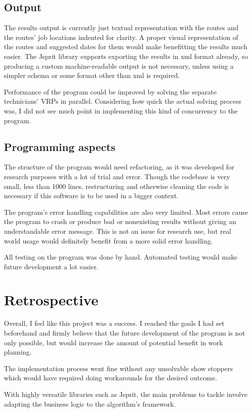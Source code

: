 \subsection{Output}
The results output is currently just textual representation with the routes and the routes' job locations indented for clarity. A proper visual representation of the routes and suggested dates for them would make benefitting the results much easier. The Jsprit library supports exporting the results in xml format already, so producing a custom machine-readable output is not necessary, unless using a simpler schema or some format other than xml is required.

Performance of the program could be improved by solving the separate technicians' VRPs in parallel. Considering how quick the actual solving process was, I did not see much point in implementing this kind of concurrency to the program. 

\subsection{Programming aspects}
The structure of the program would need refactoring, as it was developed for research purposes with a lot of trial and error. Though the codebase is very small, less than 1000 lines, restructuring and otherwise cleaning the code is necessary if this software is to be used in a bigger context.

The program's error handling capabilities are also very limited. Most errors cause the program to crash or produce bad or nonexisting results without giving an understandable error message. This is not an issue for research use, but real world usage would definitely benefit from a more solid error handling. 

All testing on the program was done by hand. Automated testing would make future development a lot easier.


\section{Retrospective}

Overall, I feel like this project was a success. I reached the goals I had set beforehand and firmly believe that the future development of the program is not only possible, but would increase the amount of potential benefit in work planning.

The implementation process went fine without any unsolvable show stoppers which would have required doing workarounds for the desired outcome.  

With highly versatile libraries such as Jsprit, the main problems to tackle involve adapting the business logic to the algorithm's framework.  